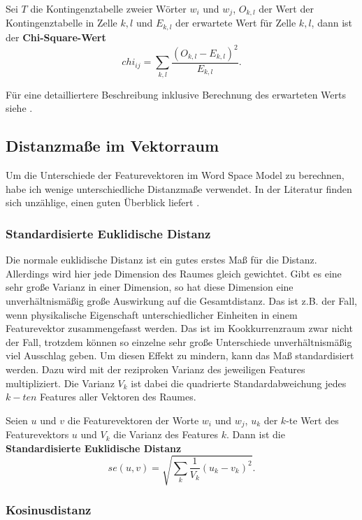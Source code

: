 \documentclass[11pt,numbers=noenddot]{scrartcl}
\begin{document}
Sei $T$ die Kontingenztabelle zweier Wörter $w_i$ und $w_j$, $O_{k,l}$ der Wert der Kontingenztabelle in Zelle $k,l$ und $E_{k,l}$ der erwartete Wert für Zelle $k,l$, dann ist der \textbf{Chi-Square-Wert}
\begin{equation*}
   chi_{ij} = \sum_{k,l} { \frac{ (O_{k,l} - E_{k,l})^2} {E_{k,l}}  }.
\end{equation*}

Für eine detailliertere Beschreibung inklusive Berechnung des erwarteten Werts siehe \citet[S. 169ff.]{manning1999}.

\subsection{Distanzmaße im Vektorraum}

Um die Unterschiede der Featurevektoren im Word Space Model zu berechnen, habe ich wenige unterschiedliche Distanzmaße verwendet. In der Literatur finden sich unzählige, einen guten Überblick liefert \citet{cha2007comprehensive}.

\subsubsection{Standardisierte Euklidische Distanz} \label{eucl}

Die normale euklidische Distanz ist ein gutes erstes Maß für die Distanz. Allerdings wird hier jede Dimension des Raumes gleich gewichtet. Gibt es eine sehr große Varianz in einer Dimension, so hat diese Dimension eine unverhältnismäßig große Auswirkung auf die Gesamtdistanz. Das ist z.B. der Fall, wenn physikalische Eigenschaft unterschiedlicher Einheiten in einem Featurevektor zusammengefasst werden. Das ist im Kookkurrenzraum zwar nicht der Fall, trotzdem können so einzelne sehr große Unterschiede unverhältnismäßig viel Ausschlag geben. Um diesen Effekt zu mindern, kann das Maß standardisiert werden. Dazu wird mit der reziproken Varianz des jeweiligen Features multipliziert. Die Varianz $V_k$ ist dabei die quadrierte Standardabweichung jedes $k-ten$ Features aller Vektoren des Raumes.

Seien $u$ und $v$ die Featurevektoren der Worte $w_i$ und $w_j$, $u_k$ der $k$-te Wert des Featurevektors $u$ und $V_k$ die Varianz des Features $k$. Dann ist die \textbf{Standardisierte Euklidische Distanz}
$$
    se(u, v) = \sqrt{ \sum_{k} {\frac{1}{V_k}{ (u_k - v_k)^2 }} }.
$$

\subsubsection{Kosinusdistanz} \label{cosi}
\end{document}
